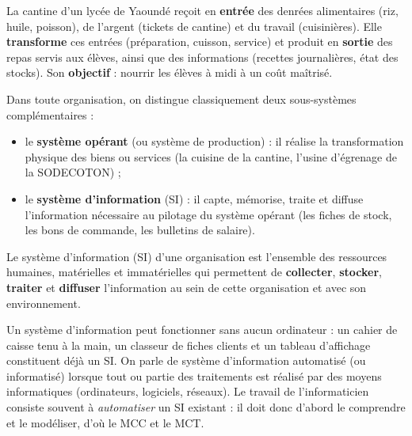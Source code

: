 \documentclass[11pt]{article}
\newcommand{\cle}[1]{{\popxbold\color{popdark}#1}}
\newcounter{popsec}
\newcounter{popsub}
\newcommand{\courssub}[1]{%
  \stepcounter{popsub}%
  \par\vspace{9pt}\noindent{\popxbold\fontsize{11.5}{13}\selectfont\color{popink}{\color{poporange}\thepopsec.\thepopsub}\hspace{6pt}#1}\par\nopagebreak\vspace{4pt}
}
\begin{document}
\begin{exemplebox}
La cantine d'un lycée de Yaoundé reçoit en \textbf{entrée} des denrées alimentaires (riz, huile, poisson), de l'argent (tickets de cantine) et du travail (cuisinières). Elle \textbf{transforme} ces entrées (préparation, cuisson, service) et produit en \textbf{sortie} des repas servis aux élèves, ainsi que des informations (recettes journalières, état des stocks). Son \textbf{objectif} : nourrir les élèves à midi à un coût maîtrisé.
\end{exemplebox}

\courssub{Le système d'information (SI)}

Dans toute organisation, on distingue classiquement deux sous-systèmes complémentaires :
\begin{itemize}
  \item le \textbf{système opérant} (ou système de production) : il réalise la transformation physique des biens ou services (la cuisine de la cantine, l'usine d'égrenage de la SODECOTON) ;
  \item le \textbf{système d'information} (SI) : il capte, mémorise, traite et diffuse l'information nécessaire au pilotage du système opérant (les fiches de stock, les bons de commande, les bulletins de salaire).
\end{itemize}

\begin{definition}
Le \cle{système d'information} (SI) d'une organisation est l'ensemble des ressources humaines, matérielles et immatérielles qui permettent de \textbf{collecter}, \textbf{stocker}, \textbf{traiter} et \textbf{diffuser} l'information au sein de cette organisation et avec son environnement.
\end{definition}

\begin{aretenir}
Un système d'information peut fonctionner sans aucun ordinateur : un cahier de caisse tenu à la main, un classeur de fiches clients et un tableau d'affichage constituent déjà un SI. On parle de \cle{système d'information automatisé} (ou informatisé) lorsque tout ou partie des traitements est réalisé par des moyens informatiques (ordinateurs, logiciels, réseaux). Le travail de l'informaticien consiste souvent à \emph{automatiser} un SI existant : il doit donc d'abord le comprendre et le modéliser, d'où le MCC et le MCT.
\end{aretenir}
\end{document}
